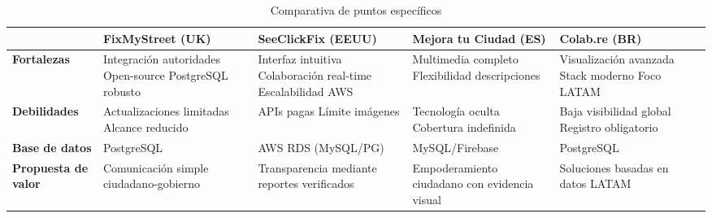 \begin{table}[H]
\centering
\begin{tabular}{|>{\centering\arraybackslash}m{2.7cm}|>{\centering\arraybackslash}m{3cm}|>{\centering\arraybackslash}m{3cm}|>{\centering\arraybackslash}m{3cm}|>{\centering\arraybackslash}m{3cm}|>{\centering\arraybackslash}m{3cm}|}
\hline
\textbf{} & \textbf{FixMyStreet (UK)} & \textbf{SeeClickFix (EEUU)} & \textbf{Mejora tu Ciudad (ES)} & \textbf{Colab.re (BR)} \\ \hline

\textbf{Fortalezas} & 
Integración autoridades \newline Open-source \newline PostgreSQL robusto & 
Interfaz intuitiva \newline Colaboración real-time \newline Escalabilidad AWS & 
Multimedia completo \newline Flexibilidad descripciones & 
Visualización avanzada \newline Stack moderno \newline Foco LATAM \\ \hline

\textbf{Debilidades} & 
Actualizaciones limitadas \newline Alcance reducido & 
APIs pagas \newline Límite imágenes & 
Tecnología oculta \newline Cobertura indefinida & 
Baja visibilidad global \newline Registro obligatorio \\ \hline

\textbf{Base de datos} & 
PostgreSQL & 
AWS RDS \newline(MySQL/PG) & 
MySQL/Firebase & 
PostgreSQL \\ \hline

\textbf{Propuesta de valor} & 
Comunicación simple \newline ciudadano-gobierno & 
Transparencia mediante \newline reportes verificados & 
Empoderamiento ciudadano \newline con evidencia visual & 
Soluciones basadas \newline en datos LATAM \\ \hline

\end{tabular}
\caption{Comparativa de puntos específicos}
\label{tab:comparativa-optimizada}
\end{table}
